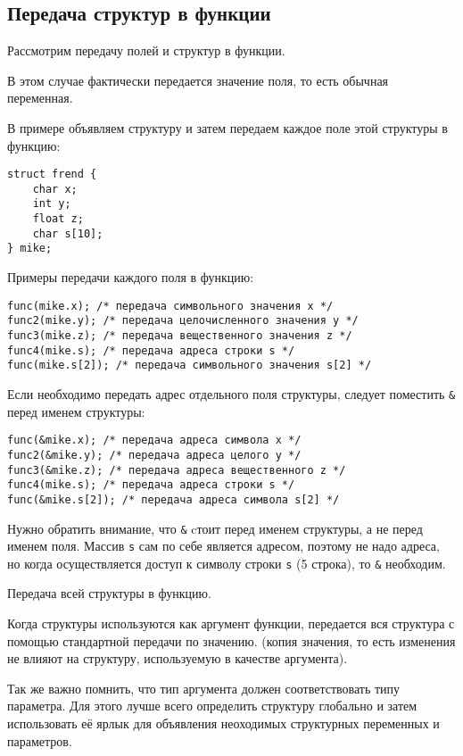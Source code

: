 \subsection{Передача структур в функции}

Рассмотрим передачу полей и структур в функции. 

В этом случае фактически передается значение поля, то есть обычная переменная.

В примере объявляем структуру и затем передаем каждое поле этой структуры в функцию:

\begin{verbatim}
struct frend { 
    char x;
    int y;
    float z;
    char s[10];
} mike;
\end{verbatim}

Примеры передачи каждого поля в функцию:

\begin{verbatim}
func(mike.x); /* передача символьного значения x */
func2(mike.y); /* передача целочисленного значения y */
func3(mike.z); /* передача вещественного значения z */
func4(mike.s); /* передача адреса строки s */
func(mike.s[2]); /* передача символьного значения s[2] */ 
\end{verbatim}

Если необходимо передать адрес отдельного поля структуры, следует поместить \texttt{\&} перед именем структуры: 

\begin{verbatim}
func(&mike.x); /* передача адреса символа x */
func2(&mike.y); /* передача адреса целого y */
func3(&mike.z); /* передача адреса вещественного z */
func4(mike.s); /* передача адреса строки s */
func(&mike.s[2]); /* передача адреса символа s[2] */
\end{verbatim}

Нужно обратить внимание, что \texttt{\&} cтоит перед именем структуры, а не перед именем поля. Массив \texttt{s} сам по себе является адресом, поэтому не надо адреса, но когда осуществляется доступ к символу строки \texttt{s} (5 строка), то \texttt{\&} необходим.

Передача всей структуры в функцию.

Когда структуры используются как аргумент функции, передается вся структура с помощью стандартной передачи по значению. (копия значения, то есть изменения не влияют на структуру, используемую в качестве аргумента).

Так же важно помнить, что тип аргумента должен соответствовать типу параметра. Для этого лучше всего определить структуру глобально и затем использовать её ярлык для объявления неоходимых структурных переменных и параметров. 

